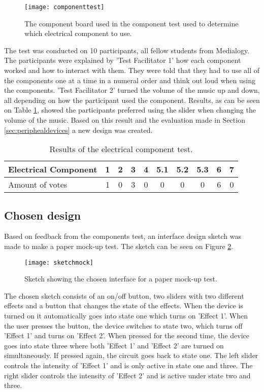 \begin{figure}[!h] 
\centering
\texttt{[image: componenttest]}
\caption{\label{fig:componenttest} The component board used in the component test used to determine which electrical component to use.}
\end{figure}

The test was conducted on 10 participants, all fellow students from Medialogy. The participants were explained by 'Test Facilitator 1' how each component worked and how to interact with them. They were told that they had to use all of the components one at a time in a numeral order and think out loud when using the components. 'Test Facilitator 2' turned the volume of the music up and down, all depending on how the participant used the component.
Results, as can be seen on Table \ref{tab:electritest}, showed the participants preferred using the slider when changing the volume of the music. Based on this result and the evaluation made in Section \ref{sec:periphealdevices} a new design was created.

\begin{table}[!h]
\centering
\caption{Results of the electrical component test.}
\label{tab:electritest}
\begin{tabular}{|l|c|c|c|c|c|c|c|c|c|}
\hline
Electrical Component & 1 & 2 & 3 & 4 & 5.1 & 5.2 & 5.3 & 6 & 7 \\ \hline
Amount of votes & 1 & 0 & 3 & 0 & 0 & 0 & 0 & 6 & 0 \\ \hline
\end{tabular}
\end{table}

\subsection{Chosen design}
Based on feedback from the components test, an interface design sketch was made to make a paper mock-up test. The sketch can be seen on Figure \ref{fig:sketchmock}. 

\begin{figure}[!h] 
\centering
\texttt{[image: sketchmock]}
\caption{\label{fig:sketchmock} Sketch showing the chosen interface for a paper mock-up test.}
\end{figure}

The chosen sketch consists of an on/off button, two sliders with two different effects and a button that changes the state of the effects. When the device is turned on it automatically goes into state one which turns on 'Effect 1'. When the user presses the button, the device switches to state two, which turns off 'Effect 1' and turns on 'Effect 2'. When pressed for the second time, the device goes into state three where both 'Effect 1' and 'Effect 2' are turned on simultaneously. If pressed again, the circuit goes back to state one. The left slider controls the intensity of 'Effect 1' and is only active in state one and three. The right slider controls the intensity of 'Effect 2' and is active under state two and three.

